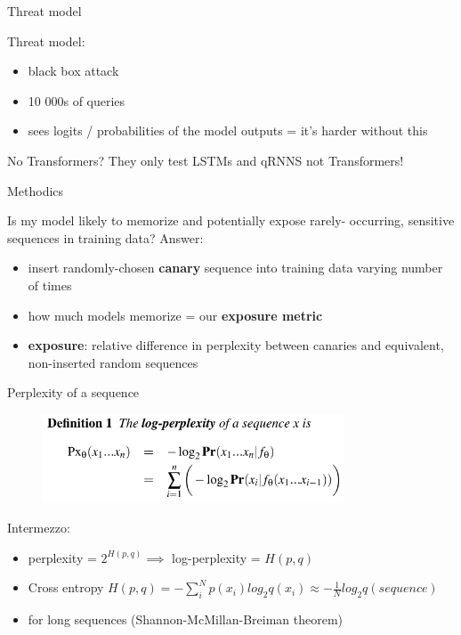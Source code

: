 \documentclass{beamer}
\begin{document}
\begin{frame}{Threat model}

Threat model:
\begin{itemize}
\item black box attack
\item 10 000s of queries
\item sees logits / probabilities of the model outputs = it's harder without this
\end{itemize}

\vfill

\begin{block}{No Transformers?}
They only test LSTMs and qRNNS not Transformers!
\end{block}

\end{frame}
\begin{frame}{Methodics}

Is my model likely to memorize and potentially expose rarely- occurring, sensitive sequences in training data?
\vfill
Answer:
\begin{itemize}
\item insert randomly-chosen \textbf{canary} sequence into training data varying number of times
\item how much models memorize = our \textbf{exposure metric} 
\item \textbf{exposure}: relative difference in perplexity between canaries and equivalent, non-inserted random sequences
\end{itemize}

\end{frame}
\begin{frame}{Perplexity of a sequence}

\begin{figure}[h]
\includegraphics[width=0.8\textwidth]{img/log-perp}
\end{figure}

\vfill

Intermezzo:
\begin{itemize}
\item perplexity = $2^{H(p,q)} \implies$ log-perplexity = $H(p,q)$
\item Cross entropy $H(p,q) = -\sum_i^N{p(x_i)log_2 q(x_i)} \approx  - \frac{1}{N}log_2 q(sequence)$ 
\item for long sequences (Shannon-McMillan-Breiman theorem)
\end{itemize}

\end{frame}
\end{document}
